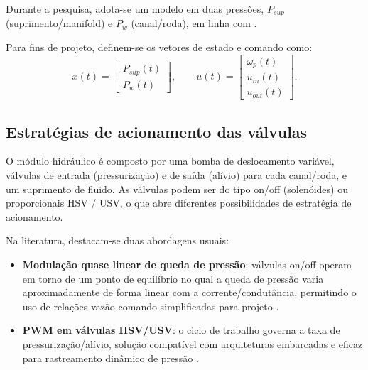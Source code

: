 Durante a pesquisa, adota-se um modelo em duas pressões, $P_{sup}$ (suprimento/manifold) e $P_w$ (canal/roda), em linha com .

Para fins de projeto, definem-se os vetores de estado e comando como:
\begin{equation}
    x(t) =
    \begin{bmatrix}
        P_{sup}(t) \\[2pt]
        P_{w}(t)
    \end{bmatrix},
    \qquad
    u(t) =
    \begin{bmatrix}
        \omega_p(t) \\[2pt]
        u_{in}(t)   \\[2pt]
        u_{out}(t)
    \end{bmatrix}.
    \label{eq:vect-estados-hidraulico}
\end{equation}


\subsection{Estratégias de acionamento das válvulas}
\label{sec:controle-4-1-1}

O módulo hidráulico é composto por uma bomba de deslocamento variável, válvulas de entrada (pressurização) e de saída (alívio) para cada canal/roda, e um suprimento de fluido. As válvulas podem ser do tipo on/off (solenóides) ou proporcionais \gls{HSV} / \gls{USV}, o que abre diferentes possibilidades de estratégia de acionamento.

Na literatura, destacam-se duas abordagens usuais:
\begin{itemize}
    \item \textbf{Modulação quase linear de queda de pressão}: válvulas on/off operam em torno de um ponto de equilíbrio no qual a queda de pressão varia aproximadamente de forma linear com a corrente/condutância, permitindo o uso de relações vazão-comando simplificadas para projeto \cite{ChenLv2017}.
    \item \textbf{PWM em válvulas HSV/USV}: o ciclo de trabalho governa a taxa de pressurização/alívio, solução compatível com arquiteturas embarcadas e eficaz para rastreamento dinâmico de pressão \cite{HouhuaJing2022}.
\end{itemize}

